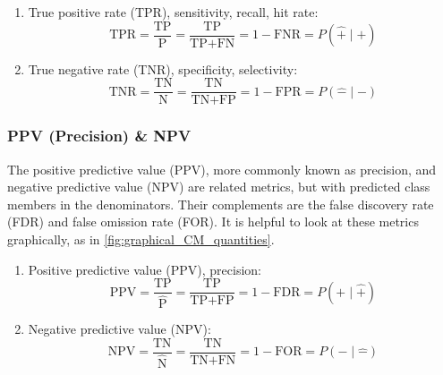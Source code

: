 \begin{enumerate}[noitemsep]
\item True positive rate (TPR), \ie sensitivity, recall, hit rate:
\begin{equation} \label{eq:TPR}
\text{TPR} = \frac{\text{TP}}{\text{P}} = \frac{\text{TP}}{\text{TP}+\text{FN}} = 1 - \text{FNR} = P\left(\hat{+} \mid + \right)
\end{equation}

\item True negative rate (TNR), \ie specificity, selectivity:
\begin{equation} \label{eq:TNR}
\text{TNR} = \frac{\text{TN}}{\text{N}} = \frac{\text{TN}}{\text{TN}+\text{FP}} = 1 - \text{FPR} = P\left(\hat{-} \mid - \right)
\end{equation}
\end{enumerate}

\subsubsection{PPV (Precision) \& NPV}
\label{ml:general:eval:PPV_NPV}

The positive predictive value (PPV), more commonly known as precision, and negative predictive value (NPV)
are related metrics, but with predicted class members in the denominators.
Their complements are the false discovery rate (FDR) and false omission rate (FOR).
It is helpful to look at these metrics graphically, as in \cref{fig:graphical_CM_quantities}.

\begin{enumerate}[noitemsep]
\item Positive predictive value (PPV), \ie precision:
\begin{equation} \label{eq:PPV}
\text{PPV} = \frac{\text{TP}}{\hat{\text{P}}} = \frac{\text{TP}}{\text{TP}+\text{FP}} = 1 - \text{FDR} = P\left(+ \mid \hat{+} \right)
\end{equation}

\item Negative predictive value (NPV):
\begin{equation} \label{eq:NPV}
\text{NPV} = \frac{\text{TN}}{\hat{\text{N}}} = \frac{\text{TN}}{\text{TN}+\text{FN}} = 1 - \text{FOR} = P\left(- \mid \hat{-} \right)
\end{equation}
\end{enumerate}

